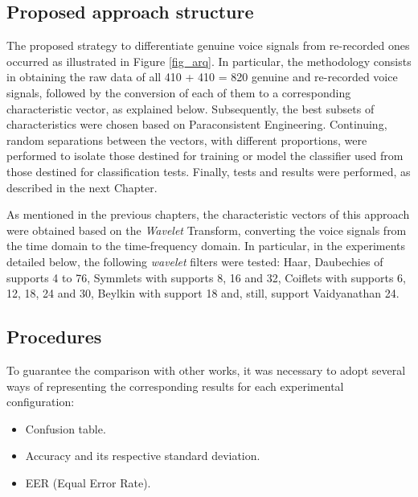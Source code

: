 	\subsection{Proposed approach structure}
	
		\par The proposed strategy to differentiate genuine voice signals from re-recorded ones occurred as illustrated in Figure \ref{fig_arq}. In particular, the methodology consists in obtaining the raw data of all 410 + 410 = 820 genuine and re-recorded voice signals, followed by the conversion of each of them to a corresponding characteristic vector, as explained below. Subsequently, the best subsets of characteristics were chosen based on Paraconsistent Engineering. Continuing, random separations between the vectors, with different proportions, were performed to isolate those destined for training or model the classifier used from those destined for classification tests. Finally, tests and results were performed, as described in the next Chapter.
		
		
		
		\par As mentioned in the previous chapters, the characteristic vectors of this approach were obtained based on the \textit{Wavelet} Transform, converting the voice signals from the time domain to the time-frequency domain. In particular, in the experiments detailed below, the following \textit{wavelet} filters were tested: Haar, Daubechies of supports 4 to 76, Symmlets with supports 8, 16 and 32, Coiflets with supports 6, 12, 18, 24 and 30, Beylkin with support 18 and, still, support Vaidyanathan 24.

	\subsection{Procedures}
	
		\par To guarantee the comparison with other works, it was necessary to adopt several ways of representing the corresponding results for each experimental configuration:
	
		\begin{itemize}
			\item Confusion table.
			\item Accuracy and its respective standard deviation.
			\item EER (Equal Error Rate).
		\end{itemize}
	
